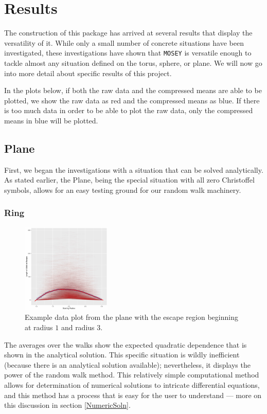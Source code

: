 \documentclass{article}
\begin{document}
\section{Results}
	The construction of this package has arrived at several results that display the versatility of it.
	While only a small number of concrete situations have been investigated, these investigations have shown that \texttt{MOSEY} is versatile enough to tackle almost any situation defined on the torus, sphere, or plane.
	We will now go into more detail about specific results of this project.
	
	In the plots below, if both the raw data and the compressed means are able to be plotted, we show the raw data as red and the compressed means as blue.
	If there is too much data in order to be able to plot the raw data, only the compressed means in blue will be plotted.
	
	\subsection{Plane}
		First, we began the investigations with a situation that can be solved analytically.
		As stated earlier, the Plane, being the special situation with all zero Christoffel symbols, allows for an easy testing ground for our random walk machinery.
		
		\subsubsection{Ring}
			\begin{figure}
				\centering
				\includegraphics[width=0.38\textwidth]{images/Plane_In1_Out3_N1000_S005.pdf}
				\caption{Example data plot from the plane with the escape region beginning at radius $1$ and radius $3$.}
			\end{figure}
			The averages over the walks show the expected quadratic dependence that is shown in the analytical solution.
			This specific situation is wildly inefficient (because there is an analytical solution available); nevertheless, it displays the power of the random walk method.
			This relatively simple computational method allows for determination of numerical solutions to intricate differential equations, and this method has a process that is easy for the user to understand --- more on this discussion in section \ref{NumericSoln}.
			
\end{document}
